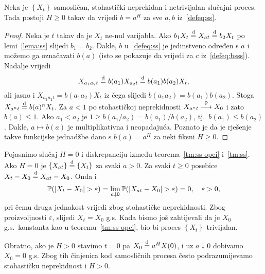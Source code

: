 \documentclass[main.tex]{subfiles}
\begin{document}
\begin{teorem}\label{tm:ss}
	Neka je \( \left\{ X_t \right\} \) samosličan, stohastički neprekidan i netrivijalan slučajni proces.
	Tada postoji \( H \ge 0 \) takav da vrijedi \( b=a^H \) za sve
	\( a, b \) iz~\eqref{defeq:ss}.
\end{teorem}

\begin{proof}
	Neka je \( t \) takav da je \( X_t \) ne-nul varijabla. Ako
	\( b_1X_t \stackrel{\mathrm d}{=} X_{at} \stackrel{\mathrm d}{=} b_2X_t \) po lemi~\ref{lema:ss} slijedi \( b_1=b_2 \).
	Dakle, \( b \) u~\eqref{defeq:ss} je jedinstveno određen s
	\( a \) i možemo ga označavati \( b(a) \) (isto se pokazuje da vrijedi za \( c \) iz~\eqref{defeq:bsss}). Nadalje vrijedi
	\[
		X_{a_1a_2t} \stackrel{\mathrm d}{=} b(a_1)X_{a_2t} \stackrel{\mathrm d}{=} b(a_1)b(a_2)X_t,
	\]
	ali jasno i \( X_{a_1a_2t} = b(a_1a_2)X_t \) iz čega slijedi \( b(a_1a_2)=b(a_1)b(a_2) \).
	Stoga \( X_{a^nt} \stackrel{\mathrm d}{=} b(a)^nX_t \). Za \( a < 1 \) po stohastičkoj neprekidnosti
	\( X_{a^nt} \stackrel{\mathbb P}{\longrightarrow} X_0 \) i zato \( b(a) \le 1 \). Ako \( a_1 < a_2 \) je
	\( 1 \ge b(a_1/a_2) = b(a_1)/b(a_2) \), tj.\ \( b(a_1) \le b(a_2) \). Dakle,
	\( a \mapsto b(a) \) je multiplikativna i neopadajuća. Poznato je da je rješenje
	takve funkcijske jednadžbe dano s \( b(a) = a^H \) za neki fiksni \( H \ge 0 \).
\end{proof}

\begin{komentar}\label{kom:ss}
	Pojasnimo slučaj \( H = 0 \) i diskrepanciju između teorema~\ref{tm:ss-opci} i~\ref{tm:ss}. Ako \( H = 0 \) je \( \left\{ X_{at} \right\} \stackrel{\mathrm d}{=} \left\{ X_t \right\}\)
	za svaki \( a > 0 \). Za svaki \( t \ge 0 \) posebice \( X_t-X_0 \stackrel{\mathrm d}{=} X_{at}-X_0 \).
	Onda i
	\begin{equation}
		\mathbb{P}(\left| {X_t-X_0} \right| > \varepsilon) = \lim\limits_{a \downarrow 0}
		\mathbb{P}(\left| {X_{at} - X_0} \right| > \varepsilon) = 0, \quad \varepsilon > 0,
	\end{equation}
	pri čemu druga jednakost vrijedi zbog stohastičke neprekidnosti.
	Zbog proizvoljnosti \( \varepsilon \), slijedi \( X_t = X_0 \) g.s.
	Kada bismo još zahtijevali da je \( X_0 \) g.s.\ konstanta kao u teoremu~\ref{tm:ss-opci},
	bio bi proces \( \left\{ X_t \right\} \) trivijalan.

	Obratno, ako je \( H > 0 \) stavimo \( t=0 \) pa \( X_0 \stackrel{\mathrm d}{=} a^HX(0) \), i
	uz \( a \downarrow 0 \) dobivamo \( X_0 = 0 \) g.s. Zbog tih činjenica
	kod samosličnih procesa često podrazumijevamo stohastičku neprekidnost
	i \( H > 0 \).
\end{komentar}
\end{document}
